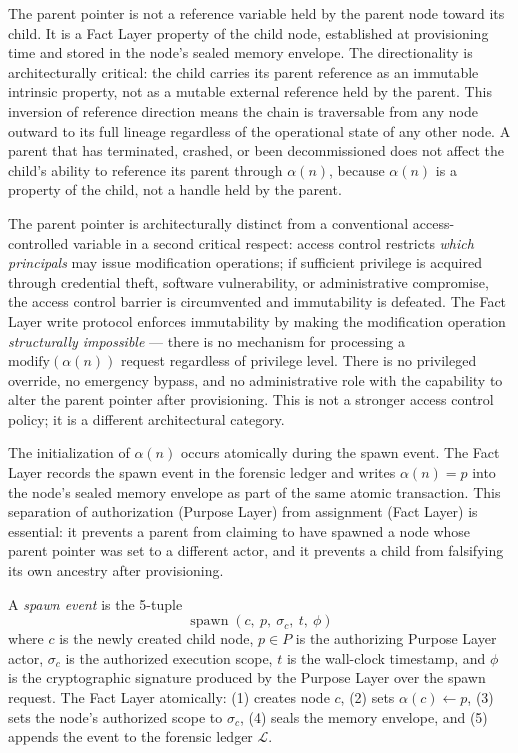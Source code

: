 The parent pointer is not a reference variable held by the parent node toward its child. It is a Fact Layer property of the child node, established at provisioning time and stored in the node's sealed memory envelope. The directionality is architecturally critical: the child carries its parent reference as an immutable intrinsic property, not as a mutable external reference held by the parent. This inversion of reference direction means the chain is traversable from any node outward to its full lineage regardless of the operational state of any other node. A parent that has terminated, crashed, or been decommissioned does not affect the child's ability to reference its parent through $\alpha(n)$, because $\alpha(n)$ is a property of the child, not a handle held by the parent.

The parent pointer is architecturally distinct from a conventional access-controlled variable in a second critical respect: access control restricts \emph{which principals} may issue modification operations; if sufficient privilege is acquired through credential theft, software vulnerability, or administrative compromise, the access control barrier is circumvented and immutability is defeated. The Fact Layer write protocol enforces immutability by making the modification operation \emph{structurally impossible} --- there is no mechanism for processing a $\text{modify}(\alpha(n))$ request regardless of privilege level. There is no privileged override, no emergency bypass, and no administrative role with the capability to alter the parent pointer after provisioning. This is not a stronger access control policy; it is a different architectural category.

The initialization of $\alpha(n)$ occurs atomically during the spawn event. The Fact Layer records the spawn event in the forensic ledger and writes $\alpha(n) = p$ into the node's sealed memory envelope as part of the same atomic transaction. This separation of authorization (Purpose Layer) from assignment (Fact Layer) is essential: it prevents a parent from claiming to have spawned a node whose parent pointer was set to a different actor, and it prevents a child from falsifying its own ancestry after provisioning.

\begin{dfn}
\label{dfn:spawn-event}
A \emph{spawn event} is the 5-tuple
\begin{equation}
\operatorname{spawn}(c,\ p,\ \sigma_c,\ t,\ \phi)
\end{equation}
where $c$ is the newly created child node, $p \in P$ is the authorizing Purpose Layer actor, $\sigma_c$ is the authorized execution scope, $t$ is the wall-clock timestamp, and $\phi$ is the cryptographic signature produced by the Purpose Layer over the spawn request. The Fact Layer atomically: (1) creates node $c$, (2) sets $\alpha(c) \leftarrow p$, (3) sets the node's authorized scope to $\sigma_c$, (4) seals the memory envelope, and (5) appends the event to the forensic ledger $\mathcal{L}$.
\end{dfn}

